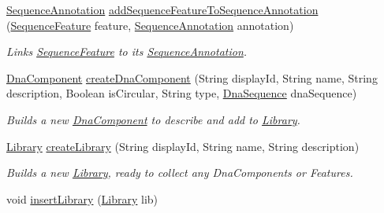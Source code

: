 \begin{DoxyCompactItemize}
\hyperlink{classorg_1_1sbolstandard_1_1lib_s_b_o_lj_1_1_sequence_annotation}{SequenceAnnotation} \hyperlink{classorg_1_1sbolstandard_1_1lib_s_b_o_lj_1_1_sbol_service_a4dbd0885b3977f121439873805a294ba}{addSequenceFeatureToSequenceAnnotation} (\hyperlink{classorg_1_1sbolstandard_1_1lib_s_b_o_lj_1_1_sequence_feature}{SequenceFeature} feature, \hyperlink{classorg_1_1sbolstandard_1_1lib_s_b_o_lj_1_1_sequence_annotation}{SequenceAnnotation} annotation)
\begin{DoxyCompactList}\small\item\em Links \hyperlink{classorg_1_1sbolstandard_1_1lib_s_b_o_lj_1_1_sequence_feature}{SequenceFeature} to its \hyperlink{classorg_1_1sbolstandard_1_1lib_s_b_o_lj_1_1_sequence_annotation}{SequenceAnnotation}. \item\end{DoxyCompactList}\item 
\hyperlink{classorg_1_1sbolstandard_1_1lib_s_b_o_lj_1_1_dna_component}{DnaComponent} \hyperlink{classorg_1_1sbolstandard_1_1lib_s_b_o_lj_1_1_sbol_service_ad3946d924f4c43fa442841aa5d56d474}{createDnaComponent} (String displayId, String name, String description, Boolean isCircular, String type, \hyperlink{classorg_1_1sbolstandard_1_1lib_s_b_o_lj_1_1_dna_sequence}{DnaSequence} dnaSequence)
\begin{DoxyCompactList}\small\item\em Builds a new \hyperlink{classorg_1_1sbolstandard_1_1lib_s_b_o_lj_1_1_dna_component}{DnaComponent} to describe and add to \hyperlink{classorg_1_1sbolstandard_1_1lib_s_b_o_lj_1_1_library}{Library}. \item\end{DoxyCompactList}\item 
\hyperlink{classorg_1_1sbolstandard_1_1lib_s_b_o_lj_1_1_library}{Library} \hyperlink{classorg_1_1sbolstandard_1_1lib_s_b_o_lj_1_1_sbol_service_a7a21049be3161d93bd273e6906899c5a}{createLibrary} (String displayId, String name, String description)
\begin{DoxyCompactList}\small\item\em Builds a new \hyperlink{classorg_1_1sbolstandard_1_1lib_s_b_o_lj_1_1_library}{Library}, ready to collect any DnaComponents or Features. \item\end{DoxyCompactList}\item 
void \hyperlink{classorg_1_1sbolstandard_1_1lib_s_b_o_lj_1_1_sbol_service_a96b5821c89233871863efb31ae98d629}{insertLibrary} (\hyperlink{classorg_1_1sbolstandard_1_1lib_s_b_o_lj_1_1_library}{Library} lib)

\end{DoxyCompactItemize}
